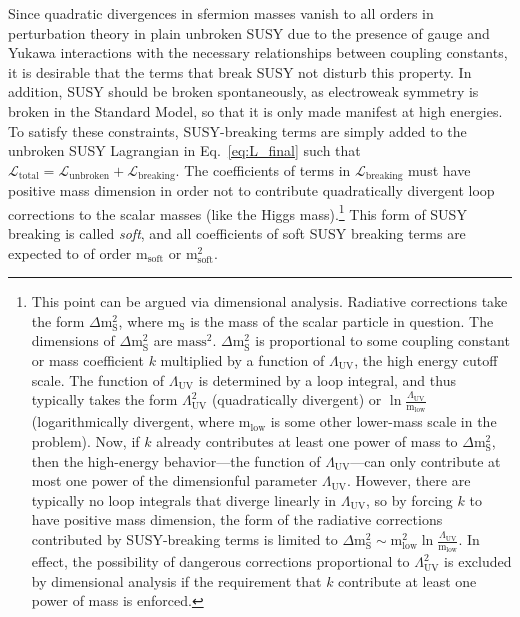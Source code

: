 \documentclass[dissertation.tex]{subfiles}
\begin{document}
Since quadratic divergences in sfermion masses vanish to all orders in perturbation theory in plain unbroken SUSY\cite{SUSY_primer} due to the presence of gauge and Yukawa interactions with the necessary relationships between coupling constants, it is desirable that the terms that break SUSY not disturb this property.  In addition, SUSY should be broken spontaneously, as electroweak symmetry is broken in the Standard Model, so that it is only made manifest at high energies.  To satisfy these constraints, SUSY-breaking terms are simply added to the unbroken SUSY Lagrangian in Eq.~\ref{eq:L_final} such that $\mathcal{L}_{\mathrm{total}} = \mathcal{L}_{\mathrm{unbroken}} + \mathcal{L}_{\mathrm{breaking}}$.  The coefficients of terms in $\mathcal{L}_{\mathrm{breaking}}$ must have positive mass dimension in order not to contribute quadratically divergent loop corrections to the scalar masses (like the Higgs mass).\footnote{This point can be argued via dimensional analysis.  Radiative corrections take the form $\Delta\mbox{m}_{\mathrm{S}}^{2}$, where $\mbox{m}_{\mathrm{S}}$ is the mass of the scalar particle in question.  The dimensions of $\Delta\mbox{m}_{\mathrm{S}}^{2}$ are $\mbox{mass}^{2}$.  $\Delta\mbox{m}_{\mathrm{S}}^{2}$ is proportional to some coupling constant or mass coefficient $k$ multiplied by a function of $\Lambda_{\mathrm{UV}}$, the high energy cutoff scale.  The function of $\Lambda_{\mathrm{UV}}$ is determined by a loop integral, and thus typically takes the form $\Lambda_{\mathrm{UV}}^{2}$ (quadratically divergent) or $\ln\frac{\Lambda_{\mathrm{UV}}}{\mbox{m}_{\mathrm{low}}}$ (logarithmically divergent, where $\mbox{m}_{\mathrm{low}}$ is some other lower-mass scale in the problem).  Now, if $k$ already contributes at least one power of mass to $\Delta\mbox{m}_{\mathrm{S}}^{2}$, then the high-energy behavior---the function of $\Lambda_{\mathrm{UV}}$---can only contribute at most one power of the dimensionful parameter $\Lambda_{\mathrm{UV}}$.  However, there are typically no loop integrals that diverge linearly in $\Lambda_{\mathrm{UV}}$, so by forcing $k$ to have positive mass dimension, the form of the radiative corrections contributed by SUSY-breaking terms is limited to $\Delta\mbox{m}_{\mathrm{S}}^{2} \sim \mbox{m}_{\mathrm{low}}^{2}\ln\frac{\Lambda_{\mathrm{UV}}}{\mbox{m}_{\mathrm{low}}}$.  In effect, the possibility of dangerous corrections proportional to $\Lambda_{\mathrm{UV}}^{2}$ is excluded by dimensional analysis if the requirement that $k$ contribute at least one power of mass is enforced.}  This form of SUSY breaking is called \textit{soft}, and all coefficients of soft SUSY breaking terms are expected to of order $\mbox{m}_{\mathrm{soft}}$ or $\mbox{m}_{\mathrm{soft}}^{2}$.
\end{document}
